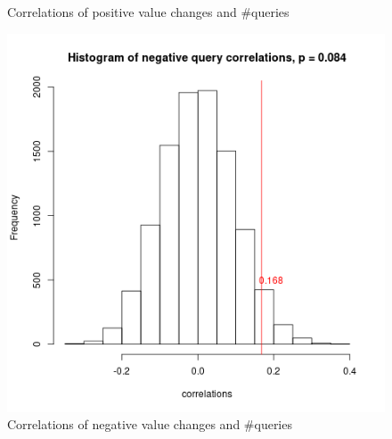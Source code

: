 \documentclass[12pt]{article}
\begin{document}
\begin{figure}[!htb]
  \caption{Correlations of positive value changes and \#queries}\label{fig:posTrendCorrelation}
\endminipage\hfill
{}%
  \includegraphics[width=\linewidth]{negativeQueryCorrelations.png}
  \caption{Correlations of negative value changes and \#queries}\label{fig:negTrendCorrelation}
\endminipage
\end{figure}
\end{document}
